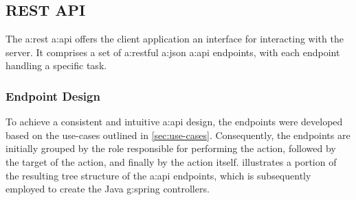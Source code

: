 
\pagebreak

\subsection{REST API}\label{sec:cs-api}

The \gls{a:rest} \gls{a:api} offers the client application an interface for interacting with the server. It comprises a set of \gls{a:rest}ful \gls{a:json} \gls{a:api} endpoints, with each endpoint handling a specific task.

\subsubsection{Endpoint Design}\label{sec:cs-api-endpoints}

To achieve a consistent and intuitive \gls{a:api} design, the endpoints were developed based on the use-cases outlined in \cref{sec:use-cases}. Consequently, the endpoints are initially grouped by the role responsible for performing the action, followed by the target of the action, and finally by the action itself.  illustrates a portion of the resulting tree structure of the \gls{a:api} endpoints, which is subsequently employed to create the Java \gls{g:spring} controllers.

